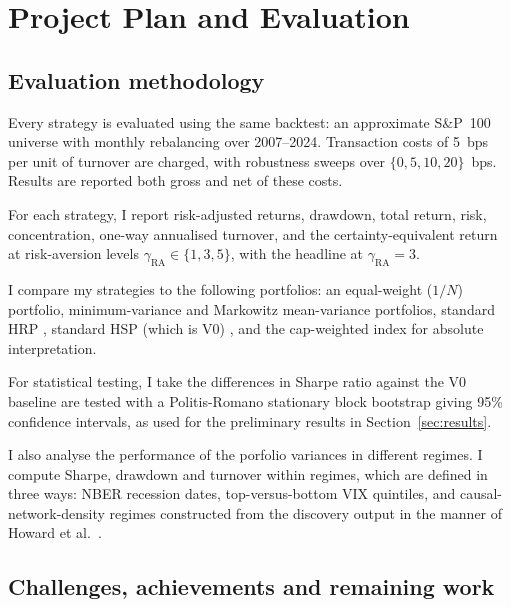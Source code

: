 \documentclass[12pt, a4paper]{report}
\begin{document}
\chapter{Project Plan and Evaluation}
\label{chap:plan}

\section{Evaluation methodology}
\label{sec:eval}

Every strategy is evaluated using the same backtest: an approximate S\&P~100 universe with
monthly rebalancing over 2007--2024. 
Transaction costs of 5~bps per unit of turnover are charged, with robustness sweeps over $\{0, 5, 10, 20\}$~bps.
Results are reported both gross and net of these costs.

For each strategy, I report risk-adjusted returns, drawdown, total return, risk, concentration, one-way annualised turnover, and the
certainty-equivalent return at risk-aversion levels $\gamma_{\text{RA}} \in \{1, 3, 5\}$, with the
headline at $\gamma_{\text{RA}} = 3$.

I compare my strategies to the following portfolios: an equal-weight ($1/N$) portfolio,
minimum-variance and Markowitz mean-variance portfolios,
standard HRP \cite{lopezdeprado2016hrp}, standard HSP (which is V0) \cite{rodriguez2023hsp}, and the
cap-weighted index for absolute interpretation.

For statistical testing, I take the differences in Sharpe ratio against the V0 baseline are tested with
a Politis-Romano stationary block bootstrap \cite{politis1994stationary} giving 95\% confidence
intervals, as used for the preliminary results in Section~\ref{sec:results}.

I also analyse the performance of the porfolio variances in different regimes. I compute Sharpe, drawdown and turnover within regimes, which are defined in three ways: NBER recession dates, top-versus-bottom VIX quintiles, and
causal-network-density regimes constructed from the discovery output in the manner of
Howard et al.\ \cite{howard2025causal}.

\section{Challenges, achievements and remaining work}
\label{sec:map}
\end{document}
